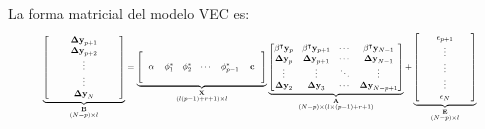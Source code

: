 La forma matricial del modelo VEC es:
\begin{equation} \label{eq:vecmatrix}
\resizebox{0.9\hsize}{!}{$%
\underbrace{
                \left[ \begin{array}{ccc}
               \quad & \mathbf{\Delta y}_{p+1} & \quad \\ 
               \quad & \mathbf{\Delta y}_{p+2} & \quad \\
               \quad & \vdots & \quad \\ 
               \quad & \vdots & \quad \\  
               \quad & \mathbf{\Delta y}_N & \quad 
               \end{array} \right]}_{\substack{\mathbf{B}\\ (N-p) \times l }} =
   \underbrace{\left[ 
    \begin{array}{cccccc}
     \quad & \quad & \quad & \quad & \quad & \quad \\
     \alpha & \phi_1^*  & \phi_2^* & \cdots & \phi_{p-1}^* & \mathbf{c} \\  
     \quad &\quad &\quad & \quad & \quad & \quad
     \end{array} 
      \right]}_{\substack{ \mathbf{X}\\ (l(p-1)+r+1) \times l}}
\underbrace{\begin{bmatrix} 
   \beta^\intercal \mathbf{y}_{p} & 
   \beta^\intercal \mathbf{y}_{p+1}&
   \cdots & \beta^\intercal \mathbf{y}_{N-1} \\
   \mathbf{\Delta y}_p & \mathbf{\Delta y}_{p+1} & \cdots 
   & \mathbf{\Delta y}_{N-1} \\ 
   \vdots & \vdots & \ddots & \vdots \\
   \mathbf{\Delta y}_2 & \mathbf{\Delta y}_{3} & \cdots 
   & \mathbf{\Delta y}_{N-p+1} \\ 
   \end{bmatrix}}_{\substack{\mathbf{A} \\ (N-p) \times (l \times (p-1)+r+1) }}
+
\underbrace{\begin{bmatrix}
              \quad &\mathbf{\epsilon}_{p+1} & \quad \\ 
              \quad &\vdots & \quad\\ 
              \quad & \vdots & \quad\\
              \quad & \vdots & \quad\\
              \quad &\mathbf{\epsilon}_N & \quad
             \end{bmatrix}}_{\substack{\mathbf{E}\\ (N-p) \times l }} 
$}
\end{equation}


